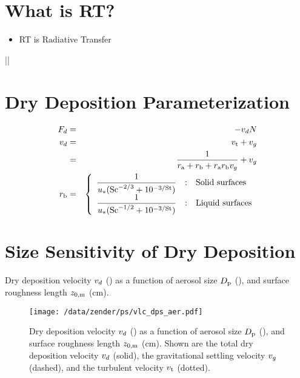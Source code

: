 \documentclass[12pt]{article}
\begin{document}
\section[RT]{What is RT?}
\begin{itemize}
\item RT is Radiative Transfer
\end{itemize}
\begin{decl}
|\margins|
\end{decl}
\vfill

\section{Dry Deposition Parameterization}
\pagedissolve{} %
\begin{eqnarray}
\flxdps & = & - \vlcdps \cnc \\ %
\label{eqn:flx_dps_dfn}
\vlcdps & = & \vlctrb + \vlcgrv \nonumber \\
\label{eqn:vlc_dps_dfn}
& = & \frac{1}{\rssaer + \rsslmn + \rssaer \rsslmn \vlcgrv } + \vlcgrv \\
\label{eqn:rss_dps_dfn}
\rsslmn & = & \left\{
\begin{array}{ >{\displaystyle}l<{} @{\quad:\quad}l}
\frac{ 1}{\wndfrc ( \shmnbr^{-2/3} + 10^{-3/\stknbr} ) } & \mbox{Solid surfaces} \\
\frac{ 1}{\wndfrc ( \shmnbr^{-1/2} + 10^{-3/\stknbr} ) } & \mbox{Liquid surfaces}
\end{array} \right.
\label{eqn:rss_lmn_dfn}
\end{eqnarray}
\vfill

\section{Size Sensitivity of Dry Deposition}
Dry deposition velocity $v_{d}$ (\cmxs) as a function of aerosol
size $D_{\mathrm{\mathrm{p}}}$ (\um), and surface roughness length $z_{0,\mathrm{m}}$ (cm).
\begin{figure*}
\texttt{[image: /data/zender/ps/vlc\_dps\_aer.pdf]}\vfill
\caption[Dry Deposition Velocity]{
Dry deposition velocity $v_{d}$ (\cmxs) as a function of aerosol
size $D_{\mathrm{\mathrm{p}}}$ (\um), and surface roughness length $z_{0,\mathrm{m}}$ (cm).
Shown are the total dry deposition velocity $v_{d}$ (solid), 
the gravitational settling velocity $v_{g}$ (dashed), and the
turbulent velocity $v_{\mathrm{t}}$ (dotted).
\label{fgr:vlc_dps_aer}}
\end{figure*}
\vfill
\clearpage
\end{document}
